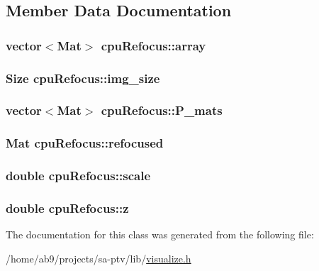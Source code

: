\subsection{Member Data Documentation}
\hypertarget{classcpuRefocus_a6eda3a5bcf68f0eaee5cc2ee70f7302b}{
\subsubsection[{array}]{\setlength{\rightskip}{0pt plus 5cm}vector$<$Mat$>$ cpu\-Refocus\-::array}}\label{db/df2/classcpuRefocus_a6eda3a5bcf68f0eaee5cc2ee70f7302b}
\hypertarget{classcpuRefocus_ac2b296ff170fd88ef9c3bb31e1ef9a7b}{
\subsubsection[{img\-\_\-size}]{\setlength{\rightskip}{0pt plus 5cm}Size cpu\-Refocus\-::img\-\_\-size}}\label{db/df2/classcpuRefocus_ac2b296ff170fd88ef9c3bb31e1ef9a7b}
\hypertarget{classcpuRefocus_a5118d8dd93e7f29036018f0298f3e510}{
\subsubsection[{P\-\_\-mats}]{\setlength{\rightskip}{0pt plus 5cm}vector$<$Mat$>$ cpu\-Refocus\-::\-P\-\_\-mats}}\label{db/df2/classcpuRefocus_a5118d8dd93e7f29036018f0298f3e510}
\hypertarget{classcpuRefocus_a0fddfc2019021e97892314faef6bf211}{
\subsubsection[{refocused}]{\setlength{\rightskip}{0pt plus 5cm}Mat cpu\-Refocus\-::refocused}}\label{db/df2/classcpuRefocus_a0fddfc2019021e97892314faef6bf211}
\hypertarget{classcpuRefocus_a04beb5d2309c9fd6ab07af93c5bfdbfa}{
\subsubsection[{scale}]{\setlength{\rightskip}{0pt plus 5cm}double cpu\-Refocus\-::scale}}\label{db/df2/classcpuRefocus_a04beb5d2309c9fd6ab07af93c5bfdbfa}
\hypertarget{classcpuRefocus_a9a19ed4cd125f555ca8a646574b0593c}{
\subsubsection[{z}]{\setlength{\rightskip}{0pt plus 5cm}double cpu\-Refocus\-::z}}\label{db/df2/classcpuRefocus_a9a19ed4cd125f555ca8a646574b0593c}


The documentation for this class was generated from the following file\-:\begin{DoxyCompactItemize}
\item 
/home/ab9/projects/sa-\/ptv/lib/\hyperlink{visualize_8h}{visualize.\-h}\end{DoxyCompactItemize}
